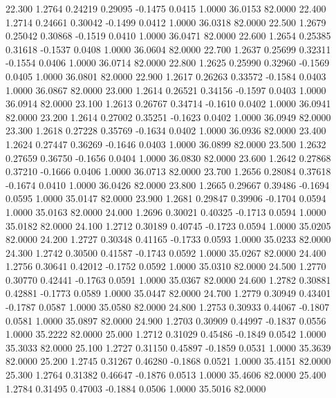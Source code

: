   22.300   1.2764   0.24219   0.29095  -0.1475   0.0415   1.0000  36.0153  82.0000
  22.400   1.2714   0.24661   0.30042  -0.1499   0.0412   1.0000  36.0318  82.0000
  22.500   1.2679   0.25042   0.30868  -0.1519   0.0410   1.0000  36.0471  82.0000
  22.600   1.2654   0.25385   0.31618  -0.1537   0.0408   1.0000  36.0604  82.0000
  22.700   1.2637   0.25699   0.32311  -0.1554   0.0406   1.0000  36.0714  82.0000
  22.800   1.2625   0.25990   0.32960  -0.1569   0.0405   1.0000  36.0801  82.0000
  22.900   1.2617   0.26263   0.33572  -0.1584   0.0403   1.0000  36.0867  82.0000
  23.000   1.2614   0.26521   0.34156  -0.1597   0.0403   1.0000  36.0914  82.0000
  23.100   1.2613   0.26767   0.34714  -0.1610   0.0402   1.0000  36.0941  82.0000
  23.200   1.2614   0.27002   0.35251  -0.1623   0.0402   1.0000  36.0949  82.0000
  23.300   1.2618   0.27228   0.35769  -0.1634   0.0402   1.0000  36.0936  82.0000
  23.400   1.2624   0.27447   0.36269  -0.1646   0.0403   1.0000  36.0899  82.0000
  23.500   1.2632   0.27659   0.36750  -0.1656   0.0404   1.0000  36.0830  82.0000
  23.600   1.2642   0.27868   0.37210  -0.1666   0.0406   1.0000  36.0713  82.0000
  23.700   1.2656   0.28084   0.37618  -0.1674   0.0410   1.0000  36.0426  82.0000
  23.800   1.2665   0.29667   0.39486  -0.1694   0.0595   1.0000  35.0147  82.0000
  23.900   1.2681   0.29847   0.39906  -0.1704   0.0594   1.0000  35.0163  82.0000
  24.000   1.2696   0.30021   0.40325  -0.1713   0.0594   1.0000  35.0182  82.0000
  24.100   1.2712   0.30189   0.40745  -0.1723   0.0594   1.0000  35.0205  82.0000
  24.200   1.2727   0.30348   0.41165  -0.1733   0.0593   1.0000  35.0233  82.0000
  24.300   1.2742   0.30500   0.41587  -0.1743   0.0592   1.0000  35.0267  82.0000
  24.400   1.2756   0.30641   0.42012  -0.1752   0.0592   1.0000  35.0310  82.0000
  24.500   1.2770   0.30770   0.42441  -0.1763   0.0591   1.0000  35.0367  82.0000
  24.600   1.2782   0.30881   0.42881  -0.1773   0.0589   1.0000  35.0447  82.0000
  24.700   1.2779   0.30949   0.43401  -0.1787   0.0587   1.0000  35.0580  82.0000
  24.800   1.2753   0.30933   0.44067  -0.1807   0.0581   1.0000  35.0897  82.0000
  24.900   1.2703   0.30909   0.44997  -0.1837   0.0556   1.0000  35.2222  82.0000
  25.000   1.2712   0.31029   0.45486  -0.1849   0.0542   1.0000  35.3033  82.0000
  25.100   1.2727   0.31150   0.45897  -0.1859   0.0531   1.0000  35.3639  82.0000
  25.200   1.2745   0.31267   0.46280  -0.1868   0.0521   1.0000  35.4151  82.0000
  25.300   1.2764   0.31382   0.46647  -0.1876   0.0513   1.0000  35.4606  82.0000
  25.400   1.2784   0.31495   0.47003  -0.1884   0.0506   1.0000  35.5016  82.0000
